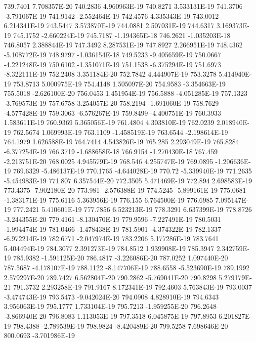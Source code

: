 739.7401  7.708357E-20
740.2836  4.960963E-19
740.8271  3.533131E-19
741.3706  -3.791067E-19
741.9142  -2.552464E-19
742.4576  4.335343E-19
743.0012  6.214341E-19
743.5447  3.573870E-19
744.0881  2.507031E-19
744.6317  3.169373E-19
745.1752  -2.660224E-19
745.7187  -1.194365E-18
746.2621  -1.035203E-18
746.8057  2.388844E-19
747.3492  8.287531E-19
747.8927  2.266951E-19
748.4362  -5.108772E-19
748.9797  -1.036154E-18
749.5233  -9.405659E-19
750.0667  -4.221248E-19
750.6102  -1.351071E-19
751.1538  -6.375294E-19
751.6973  -8.322111E-19
752.2408  3.351184E-20
752.7842  4.444907E-19
753.3278  5.414940E-19
753.8713  5.000975E-19
754.4148  1.505097E-20
754.9583  -3.354663E-19
755.5018  -2.626100E-20
756.0453  1.451954E-19
756.5888  -4.051285E-19
757.1323  -3.769573E-19
757.6758  3.254057E-20
758.2194  -1.691060E-19
758.7629  -4.577428E-19
759.3063  -6.576267E-19
759.8499  -4.400751E-19
760.3933  1.583611E-19
760.9369  5.365056E-19
761.4804  4.303810E-19
762.0239  2.018940E-19
762.5674  1.069993E-19
763.1109  -1.458519E-19
763.6544  -2.198614E-19
764.1979  1.626588E-19
764.7414  4.543826E-19
765.285  2.293049E-19
765.8284  -6.377254E-19
766.3719  -1.688658E-18
766.9154  -1.270430E-18
767.459  -2.213751E-20
768.0025  4.945579E-19
768.546  4.255747E-19
769.0895  -1.206636E-19
769.6329  -5.486137E-19
770.1765  -4.644028E-19
770.72  -5.339940E-19
771.2635  -5.454983E-19
771.807  6.357544E-20
772.3505  5.471469E-19
772.894  2.698583E-19
773.4375  -7.902180E-20
773.981  -2.576388E-19
774.5245  -5.899161E-19
775.0681  -1.383171E-19
775.6116  5.363956E-19
776.155  6.764500E-19
776.6985  7.095147E-19
777.2421  5.410601E-19
777.7856  6.523213E-19
778.3291  6.637399E-19
778.8726  -3.244355E-20
779.4161  -8.130470E-19
779.9596  -7.227491E-19
780.5031  -1.994474E-19
781.0466  -1.478438E-19
781.5901  -4.374322E-19
782.1337  -6.972214E-19
782.6771  -2.047974E-19
783.2206  5.177286E-19
783.7641  5.404494E-19
784.3077  2.391273E-19
784.8512  1.939908E-19
785.3947  2.342759E-19
785.9382  -1.591125E-20
786.4817  -3.226086E-20
787.0252  1.097440E-20
787.5687  -4.178107E-19
788.1122  -8.147706E-19
788.6558  -5.523690E-19
789.1992  2.579297E-20
789.7427  6.562804E-20
790.2862  -5.769041E-20
790.8298  5.279179E-21
791.3732  2.293258E-19
791.9167  8.172341E-19
792.4603  5.763843E-19
793.0037  -3.474743E-19
793.5473  -9.042024E-20
794.0908  4.828910E-19
794.6343  3.956063E-19
795.1777  1.733104E-19
795.7213  -1.959255E-20
796.2648  -3.866940E-20
796.8083  1.113053E-19
797.3518  6.045875E-19
797.8953  6.201827E-19
798.4388  -2.789539E-19
798.9824  -8.420489E-20
799.5258  7.698646E-20
800.0693  -3.701986E-19
